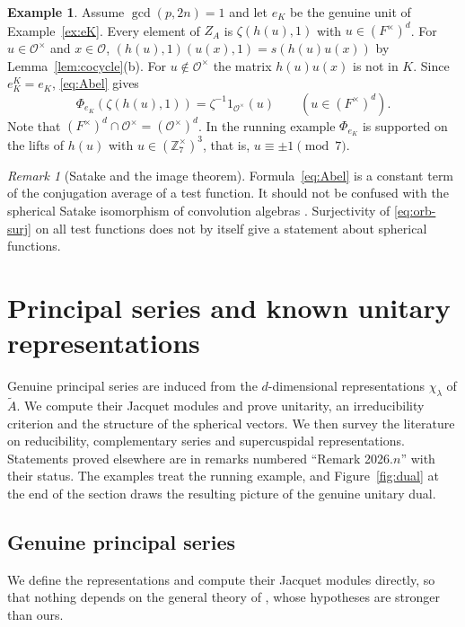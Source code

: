 \documentclass[12pt,letterpaper]{article}
\numberwithin{equation}{section}
\theoremstyle{plain}
\theoremstyle{definition}
\newtheorem{example}[theorem]{Example}
\theoremstyle{remark}
\newtheorem{remark}[theorem]{Remark}
\newcommand{\At}{\widetilde A}
\newcommand{\Zz}{\mathbb Z}
\newcommand{\Of}{\mathcal O}
\newcommand{\ZA}{Z_A}
\begin{document}
\begin{example}\label{ex:Phi-unit}
Assume $\gcd(p,2n)=1$ and let $e_K$ be the genuine unit of
Example~\ref{ex:eK}. Every element of $\ZA$ is $\zeta(h(u),1)$ with
$u\in(F^\times)^d$. For $u\in\Of^\times$ and $x\in\Of$,
$(h(u),1)(u(x),1)=s(h(u)u(x))$ by Lemma~\ref{lem:cocycle}(b). For
$u\notin\Of^\times$ the matrix $h(u)u(x)$ is not in $K$. Since
$e_K^K=e_K$, \eqref{eq:Abel} gives
\[
\Phi_{e_K}(\zeta(h(u),1))=\zeta^{-1}1_{\Of^\times}(u)
\qquad(u\in(F^\times)^d).
\]
Note that $(F^\times)^d\cap\Of^\times=(\Of^\times)^d$. In the running
example $\Phi_{e_K}$ is supported on the lifts of $h(u)$ with
$u\in(\Zz_7^\times)^3$, that is, $u\equiv\pm1\pmod7$.
\end{example}

\begin{remark}[Satake and the image theorem]\label{rem:satake}
Formula~\eqref{eq:Abel} is a constant term of the conjugation average
of a test function. It should not be confused with the spherical
Satake isomorphism of convolution algebras \cite{Mc12}. Surjectivity of
\eqref{eq:orb-surj} on all test functions does not by itself give a
statement about spherical functions.
\end{remark}

\section{Principal series and known unitary representations}
\label{sec:unitary}

Genuine principal series are induced from the $d$-dimensional
representations $\chi_\lambda$ of $\At$. We compute their Jacquet
modules and prove unitarity, an irreducibility criterion and the
structure of the spherical vectors. We then survey the literature on
reducibility, complementary series and supercuspidal representations.
Statements proved elsewhere are in remarks numbered ``Remark 2026.$n$''
with their status. The examples treat the running example, and
Figure~\ref{fig:dual} at the end of the section draws the resulting
picture of the genuine unitary dual.

\subsection*{Genuine principal series}

We define the representations and compute their Jacquet modules
directly, so that nothing depends on the general theory of
\cite{Mc12}, whose hypotheses are stronger than ours.
\end{document}
